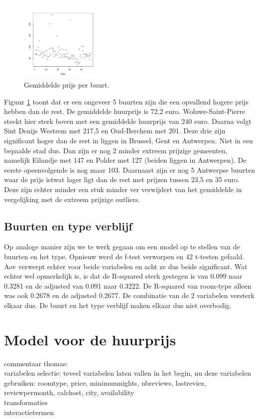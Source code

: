 \documentclass[a4paper,kulak]{kulakarticle} %
\begin{document}
\begin{figure}
	\begin{center}
		\includegraphics[width=0.35\textwidth]{pn.jpg}
	\end{center}
	\caption{Gemiddelde prijs per buurt.}
	\label{fig:pn}
\end{figure}
Figuur \ref{fig:pn} toont dat er een ongeveer 5 buurten zijn die een opvallend hogere prijs hebben dan de rest.
De gemiddelde huurprijs is 72,2 euro.
Woluwe-Saint-Pierre steekt hier sterk boven met een gemiddelde huurprijs van 240 euro.
Daarna volgt Sint Denijs Westrem met 217,5 en Oud-Berchem met 201.
Deze drie zijn significant hoger dan de rest in liggen in Brussel, Gent en Antwerpen. Niet in een bepaalde stad dus.
Dan zijn er nog 2 minder extreem prijzige gemeenten, namelijk Eilandje met 147 en Polder met 127 (beiden liggen in Antwerpen). De eerste opeenvolgende is nog maar 103.
Daarnaast zijn er nog 5 Antwerpse buurten waar de prijs ietwat lager ligt dan de rest met prijzen tussen 23,5 en 35 euro.
Deze zijn echter minder een stuk minder ver verwijdert van het gemiddelde in vergelijking met de extreem prijzige outliers.

\subsection{Buurten en type verblijf}
Op analoge manier zijn we te werk gegaan om een model op te stellen van de buurten en het type.
Opnieuw werd de f-test verworpen en 42 t-testen gefaald.
Aov verwerpt echter voor beide variabelen en acht ze dus beide significant.
Wat echter wel opmerkelijk is, is dat de R-squared sterk gestegen is van 0.099 naar 0.3281 en de adjusted van 0.091 naar 0.3222.
De R-squared van room-type alleen was ook 0.2678 en de adjusted 0.2677. De combinatie van de 2 variabelen versterk elkaar dus.
De buurt en het type verblijf maken elkaar dus niet overbodig.




\section{Model voor de huurprijs}
commentaar thomas:\\
variabelen selectie: teveel variabelen laten vallen in het begin, nu deze variabelen gebruiken: roomtype, price, minimumnights, nbreviews, lastreviez, reviewpermonth, calchost, city, availability \\
transformaties\\
interactietermen\\
\end{document}
